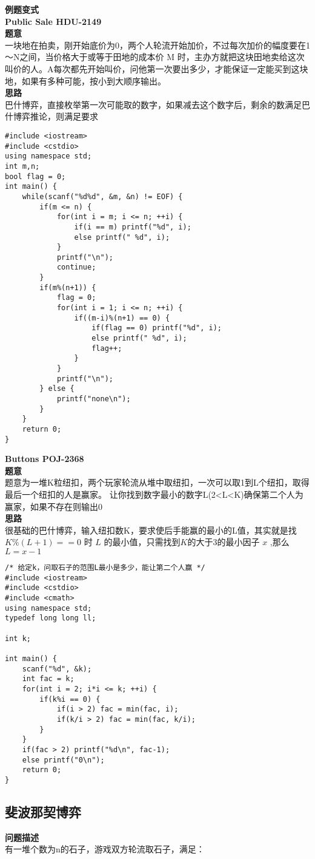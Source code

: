\textbf{例题变式}\\
\textbf{Public Sale HDU-2149}\\
\textbf{题意}\\
一块地在拍卖，刚开始底价为0，两个人轮流开始加价，不过每次加价的幅度要在1～N之间，当价格大于或等于田地的成本价 M 时，主办方就把这块田地卖给这次叫价的人。A每次都先开始叫价，问他第一次要出多少，才能保证一定能买到这块地，如果有多种可能，按小到大顺序输出。\\
\textbf{思路}\\
巴什博弈，直接枚举第一次可能取的数字，如果减去这个数字后，剩余的数满足巴什博弈推论，则满足要求\\
\begin{lstlisting}
#include <iostream>
#include <cstdio>
using namespace std;
int m,n;
bool flag = 0;
int main() {
	while(scanf("%d%d", &m, &n) != EOF) {
		if(m <= n) {
			for(int i = m; i <= n; ++i) {
				if(i == m) printf("%d", i);
				else printf(" %d", i);
			}
			printf("\n");
			continue;
		}
		if(m%(n+1)) {
			flag = 0;
			for(int i = 1; i <= n; ++i) {
				if((m-i)%(n+1) == 0) {
					if(flag == 0) printf("%d", i);
					else printf(" %d", i);
					flag++;
				}
			}
			printf("\n");
		} else {
			printf("none\n");
		}
	}
	return 0;
}
\end{lstlisting}


\textbf{Buttons POJ-2368}\\
\textbf{题意}\\
题意为一堆K粒纽扣，两个玩家轮流从堆中取纽扣，一次可以取1到L个纽扣，取得最后一个纽扣的人是赢家。 让你找到数字最小的数字L(2<L<K)确保第二个人为赢家，如果不存在则输出0\\
\textbf{思路}\\
很基础的巴什博弈，输入纽扣数K，要求使后手能赢的最小的L值，其实就是找$K \% (L+1) == 0$ 时 $L$ 的最小值，只需找到$K$的大于$3$的最小因子 $x$ ,那么$L=x-1$\\
\begin{lstlisting}
/* 给定k，问取石子的范围L最小是多少，能让第二个人赢 */
#include <iostream>
#include <cstdio>
#include <cmath>
using namespace std;
typedef long long ll;

int k;

int main() {
	scanf("%d", &k);
	int fac = k;
	for(int i = 2; i*i <= k; ++i) {
		if(k%i == 0) {
			if(i > 2) fac = min(fac, i);
			if(k/i > 2) fac = min(fac, k/i);
		}
	}
	if(fac > 2) printf("%d\n", fac-1);
	else printf("0\n");
	return 0;
}
\end{lstlisting}

\subsection{斐波那契博弈}
\textbf{问题描述}\\
有一堆个数为n的石子，游戏双方轮流取石子，满足：
\\


